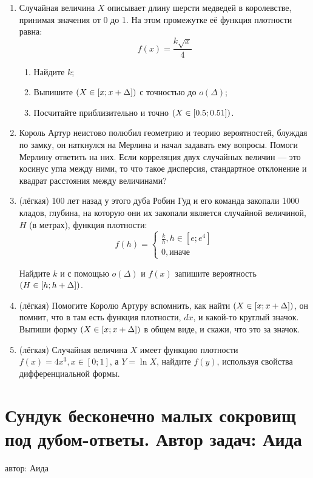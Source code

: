 \documentclass[a4paper,12pt]{article}
\let\P\relax
\DeclareMathOperator{\P}{\mathbb{P}}
\begin{document}
\begin{enumerate} %
\item Случайная величина $X$ описывает длину шерсти медведей в королевстве, принимая значения от 0 до 1. На этом промежутке её функция плотности равна:
\[
   f(x)= \frac{k\sqrt{x}}{4}
\]
\begin{enumerate}
\item Найдите $k$;
\item Выпишите $\P(X\in [x;x+\Delta])$ с точностью до $o(\Delta)$;
\item Посчитайте приблизительно и точно $\P(X\in [0.5;0.51])$.
\end{enumerate}
\item Король Артур неистово полюбил геометрию и теорию вероятностей, блуждая по замку, он наткнулся на Мерлина и начал задавать ему вопросы. Помоги Мерлину ответить на них. Если корреляция двух случайных величин — это косинус угла между ними, то что такое дисперсия, стандартное отклонение и квадрат расстояния между величинами?

\item (лёгкая) 100 лет назад у этого дуба Робин Гуд и его команда закопали 1000 кладов, глубина, на которую они их закопали является случайной величиной, $H$ (в метрах), функция плотности:
\[
   f(h)=
   \begin{cases}
   \frac{k}{h}, h\in[e ; e^4] \\
    0, \text{иначе}
    \end{cases}
\]

Найдите $k$ и с помощью $o(\Delta)$ и $f(x)$ запишите вероятность $\P(H \in [h; h + \Delta])$.
\item (лёгкая) Помогите Королю Артуру вспомнить, как найти $\P(X\in [x;x+\Delta])$, он помнит, что в там есть функция плотности, $dx$,  и какой-то круглый значок. Выпиши форму $\P(X\in [x;x+\Delta])$ в общем виде, и скажи, что это за значок.
\item (лёгкая)
Случайная величина $X$ имеет функцию плотности $f(x)=4x^3, x \in [0;1]$, а $Y=\ln{X}$, найдите $f(y)$, используя свойства дифференциальной формы.
\end{enumerate}

\newpage
\section{Сундук бесконечно малых сокровищ под дубом-ответы. Автор задач: Аида}
автор: Аида
\end{document}
